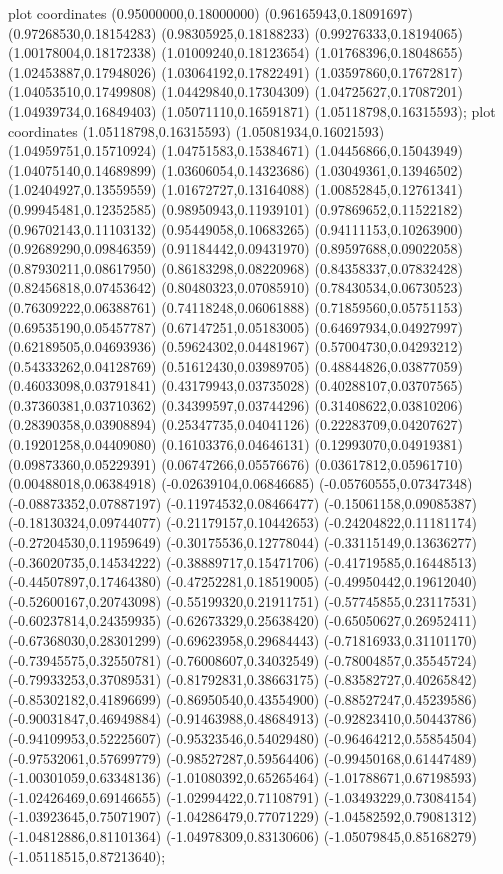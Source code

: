  plot coordinates {(0.95000000,0.18000000) (0.96165943,0.18091697) (0.97268530,0.18154283) (0.98305925,0.18188233) (0.99276333,0.18194065) (1.00178004,0.18172338) (1.01009240,0.18123654) (1.01768396,0.18048655) (1.02453887,0.17948026) (1.03064192,0.17822491) (1.03597860,0.17672817) (1.04053510,0.17499808) (1.04429840,0.17304309) (1.04725627,0.17087201) (1.04939734,0.16849403) (1.05071110,0.16591871) (1.05118798,0.16315593)};
 plot coordinates {(1.05118798,0.16315593) (1.05081934,0.16021593) (1.04959751,0.15710924) (1.04751583,0.15384671) (1.04456866,0.15043949) (1.04075140,0.14689899) (1.03606054,0.14323686) (1.03049361,0.13946502) (1.02404927,0.13559559) (1.01672727,0.13164088) (1.00852845,0.12761341) (0.99945481,0.12352585) (0.98950943,0.11939101) (0.97869652,0.11522182) (0.96702143,0.11103132) (0.95449058,0.10683265) (0.94111153,0.10263900) (0.92689290,0.09846359) (0.91184442,0.09431970) (0.89597688,0.09022058) (0.87930211,0.08617950) (0.86183298,0.08220968) (0.84358337,0.07832428) (0.82456818,0.07453642) (0.80480323,0.07085910) (0.78430534,0.06730523) (0.76309222,0.06388761) (0.74118248,0.06061888) (0.71859560,0.05751153) (0.69535190,0.05457787) (0.67147251,0.05183005) (0.64697934,0.04927997) (0.62189505,0.04693936) (0.59624302,0.04481967) (0.57004730,0.04293212) (0.54333262,0.04128769) (0.51612430,0.03989705) (0.48844826,0.03877059) (0.46033098,0.03791841) (0.43179943,0.03735028) (0.40288107,0.03707565) (0.37360381,0.03710362) (0.34399597,0.03744296) (0.31408622,0.03810206) (0.28390358,0.03908894) (0.25347735,0.04041126) (0.22283709,0.04207627) (0.19201258,0.04409080) (0.16103376,0.04646131) (0.12993070,0.04919381) (0.09873360,0.05229391) (0.06747266,0.05576676) (0.03617812,0.05961710) (0.00488018,0.06384918) (-0.02639104,0.06846685) (-0.05760555,0.07347348) (-0.08873352,0.07887197) (-0.11974532,0.08466477) (-0.15061158,0.09085387) (-0.18130324,0.09744077) (-0.21179157,0.10442653) (-0.24204822,0.11181174) (-0.27204530,0.11959649) (-0.30175536,0.12778044) (-0.33115149,0.13636277) (-0.36020735,0.14534222) (-0.38889717,0.15471706) (-0.41719585,0.16448513) (-0.44507897,0.17464380) (-0.47252281,0.18519005) (-0.49950442,0.19612040) (-0.52600167,0.20743098) (-0.55199320,0.21911751) (-0.57745855,0.23117531) (-0.60237814,0.24359935) (-0.62673329,0.25638420) (-0.65050627,0.26952411) (-0.67368030,0.28301299) (-0.69623958,0.29684443) (-0.71816933,0.31101170) (-0.73945575,0.32550781) (-0.76008607,0.34032549) (-0.78004857,0.35545724) (-0.79933253,0.37089531) (-0.81792831,0.38663175) (-0.83582727,0.40265842) (-0.85302182,0.41896699) (-0.86950540,0.43554900) (-0.88527247,0.45239586) (-0.90031847,0.46949884) (-0.91463988,0.48684913) (-0.92823410,0.50443786) (-0.94109953,0.52225607) (-0.95323546,0.54029480) (-0.96464212,0.55854504) (-0.97532061,0.57699779) (-0.98527287,0.59564406) (-0.99450168,0.61447489) (-1.00301059,0.63348136) (-1.01080392,0.65265464) (-1.01788671,0.67198593) (-1.02426469,0.69146655) (-1.02994422,0.71108791) (-1.03493229,0.73084154) (-1.03923645,0.75071907) (-1.04286479,0.77071229) (-1.04582592,0.79081312) (-1.04812886,0.81101364) (-1.04978309,0.83130606) (-1.05079845,0.85168279) (-1.05118515,0.87213640)};
